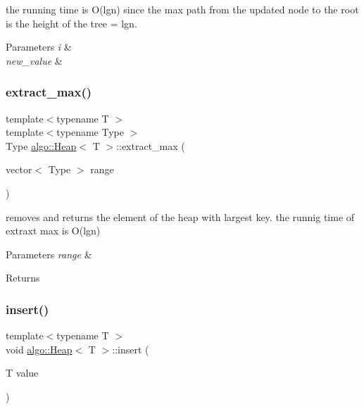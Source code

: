 the running time is O(lgn) since the max path from the updated node to the root is the height of the tree = lgn. 
\begin{DoxyParams}{Parameters}
{\em i} & \\
\hline
{\em new\+\_\+value} & \\
\hline
\end{DoxyParams}
\mbox{\label{classalgo_1_1_heap_a5de49b0b3203e1b3155bb25223be78b0}} 
\subsubsection{\texorpdfstring{extract\+\_\+max()}{extract\_max()}}
{\footnotesize\ttfamily template$<$typename T $>$ \\
template$<$typename Type $>$ \\
Type \hyperlink{classalgo_1_1_heap}{algo\+::\+Heap}$<$ T $>$\+::extract\+\_\+max (\begin{DoxyParamCaption}\item[{vector$<$ Type $>$}]{range }\end{DoxyParamCaption})\hspace{0.3cm}{\ttfamily [inline]}}

removes and returns the element of the heap with largest key. the runnig time of extraxt max is O(lgn) 
\begin{DoxyParams}{Parameters}
{\em range} & \\
\hline
\end{DoxyParams}
\begin{DoxyReturn}{Returns}

\end{DoxyReturn}
\mbox{\label{classalgo_1_1_heap_abb3877c604a9e3f897f62f00c9cff922}} 
\subsubsection{\texorpdfstring{insert()}{insert()}}
{\footnotesize\ttfamily template$<$typename T $>$ \\
void \hyperlink{classalgo_1_1_heap}{algo\+::\+Heap}$<$ T $>$\+::insert (\begin{DoxyParamCaption}\item[{T}]{value }\end{DoxyParamCaption})\hspace{0.3cm}{\ttfamily [inline]}}

